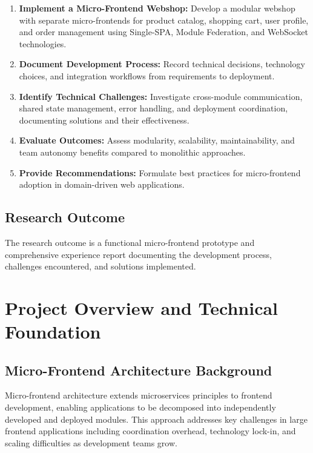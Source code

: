 \documentclass[12pt,a4paper]{report}
\begin{document}
\begin{enumerate}
    \item \textbf{Implement a Micro-Frontend Webshop:} Develop a modular webshop with separate micro-frontends for product catalog, shopping cart, user profile, and order management using Single-SPA, Module Federation, and WebSocket technologies.

    \item \textbf{Document Development Process:} Record technical decisions, technology choices, and integration workflows from requirements to deployment.

    \item \textbf{Identify Technical Challenges:} Investigate cross-module communication, shared state management, error handling, and deployment coordination, documenting solutions and their effectiveness.

    \item \textbf{Evaluate Outcomes:} Assess modularity, scalability, maintainability, and team autonomy benefits compared to monolithic approaches.

    \item \textbf{Provide Recommendations:} Formulate best practices for micro-frontend adoption in domain-driven web applications.
\end{enumerate}

\section{Research Outcome}
The research outcome is a functional micro-frontend prototype and comprehensive experience report documenting the development process, challenges encountered, and solutions implemented.

\chapter{Project Overview and Technical Foundation}
\section{Micro-Frontend Architecture Background}

Micro-frontend architecture extends microservices principles to frontend development, enabling applications to be decomposed into independently developed and deployed modules. This approach addresses key challenges in large frontend applications including coordination overhead, technology lock-in, and scaling difficulties as development teams grow.
\end{document}
